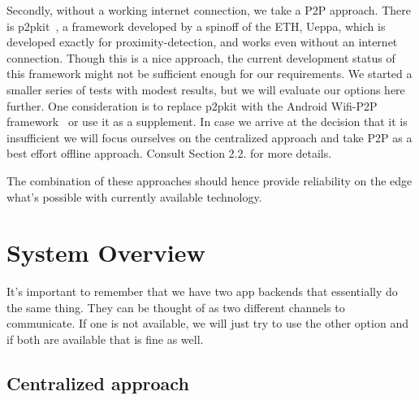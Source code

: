 \documentclass{report}
\begin{document}
Secondly, without a working internet connection, we take a P2P approach. There is p2pkit~\cite{p2pkit}, a framework developed by a spinoff of the ETH, Ueppa, which is developed exactly for proximity-detection, and works even without an internet connection. Though this is a nice approach, the current development status of this framework might not be sufficient enough for our requirements. We started a smaller series of tests with modest results, but we will evaluate our options here further. One consideration is to replace p2pkit with the Android Wifi-P2P framework~\cite{android_wifi_p2p} or use it as a supplement. In case we arrive at the decision that it is insufficient we will focus ourselves on the centralized approach and take P2P as a best effort offline approach. Consult Section 2.2. for more details.

The combination of these approaches should hence provide reliability on the edge what's possible with currently available technology.

\section{System Overview}

It's important to remember that we have two app backends that essentially do the same thing. They can be thought of as two different channels to communicate. If one is not available, we will just try to use the other option and if both are available that is fine as well.

\subsection{Centralized approach}
\end{document}
